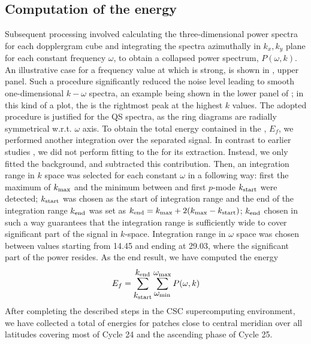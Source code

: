 \documentclass{aa}
\begin{document}
\subsection{Computation of the \fff 
energy}

Subsequent processing involved calculating the 
three-dimensional
power spectra for each dopplergram cube and 
integrating
the spectra azimuthally in $k_x, k_y$ plane for each constant frequency $\omega$,
to obtain a collapsed power spectrum, $P(\omega,k)$. An illustrative case for a frequency
value at which \fff is strong, is shown in 
,
upper panel.
Such 
a procedure
significantly reduced the noise level leading to smooth one-dimensional $k-\omega$ spectra,
an example being shown in the lower panel of ;
in this kind of a plot, the \fff is the rightmost peak at the highest $k$ values.
The adopted procedure
is justified for the 
QS
spectra, as the ring diagrams are radially symmetrical w.r.t. $\omega$ axis. 
To obtain the total energy contained in the \fff, $E_f$, we
performed another integration over the separated \fff signal.
In contrast to earlier studies \citep{SRB16,Waidele22}, we
did not perform fitting to the \fff for its extraction. 
Instead, we only fitted the background, and subtracted this 
contribution.
Then,
an integration range in $k$ space was selected for each constant $\omega$ in a following way: first the maximum of \fff $k_{\rm max}$ and the minimum between \fff and first $p$-mode $k_{\rm start}$ were detected; $k_{\rm start}$ was chosen as the start of integration range and the end of the integration range $k_{\rm end}$ was set as $k_{\rm end}=k_{\rm max}+2(k_{\rm max}-k_{\rm start})$; $k_{\rm end}$ chosen in such a way guarantees that the integration range is sufficiently wide to cover significant part of the \fff 
signal in $k$-space.
Integration range in $\omega$ space was chosen between values starting from 
14.45 and ending at 29.03, 
where the significant part of the \fff power resides. 
As the end result, we have computed the \fff energy
\begin{equation}
E_f=
\sum_{\mbox{$k_{\rm start}$}}^{\mbox{$k_{\rm end}$}}
\sum_{\mbox{$\omega_{\rm min}$}}^{\mbox{$\omega_{\rm max}$}} P(\omega,k)
\end{equation}
After completing the described steps in the CSC supercomputing
environment, we have collected a total of  \fff 
energies
for patches close to central meridian over all latitudes covering 
most of Cycle 24 and the ascending phase of Cycle 25.
\end{document}
